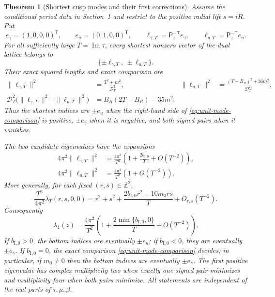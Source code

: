 \documentclass[11pt]{article}
\numberwithin{equation}{section}
\newtheorem{theorem}{Theorem}[section]
\theoremstyle{definition}
\theoremstyle{remark}
\newcommand{\Z}{\mathbb Z}
\begin{document}
\begin{theorem}[Shortest cusp modes and their first corrections]
\label{thm:cusp-gap}
Assume the conditional period data in Section~1 and restrict to the positive
radial lift $s=iR$.  Put
\[
 e_\gamma=(1,0,0,0)^{\mathsf T},\qquad
 e_u=(0,1,0,0)^{\mathsf T},\qquad
 \ell_{\gamma,T}=\mathsf P_z^{-\mathsf T}e_\gamma,\qquad
 \ell_{u,T}=\mathsf P_z^{-\mathsf T}e_u.
\]
For all sufficiently large $T=\operatorname{Im}\tau$, every shortest
nonzero vector of the dual lattice belongs to
\[
 \{\pm\ell_{\gamma,T},\ \pm\ell_{u,T}\}.
\]
Their exact squared lengths and exact comparison are
\begin{align}
 \|\ell_{\gamma,T}\|^2
 &=\frac{T^2+m^2}{\mathcal D_T^2},&
 \|\ell_{u,T}\|^2
 &=\frac{(T-B_R)^2+36m^2}{\mathcal D_T^2},
 \label{eq:unit-mode-exact-lengths}\\
 \mathcal D_T^2
 \bigl(\|\ell_{\gamma,T}\|^2-\|\ell_{u,T}\|^2\bigr)
 &=B_R(2T-B_R)-35m^2.
 \label{eq:unit-mode-comparison}
\end{align}
Thus the shortest indices are $\pm e_u$ when the right-hand side of
\eqref{eq:unit-mode-comparison} is positive, $\pm e_\gamma$ when it is
negative, and both signed pairs when it vanishes.

The two candidate eigenvalues have the expansions
\begin{align}
 4\pi^2\|\ell_{\gamma,T}\|^2
 &=\frac{4\pi^2}{T^2}
   \left(1+\frac{2b_{\mathrm I,0}}{T}+O(T^{-2})\right),
 \label{eq:gamma-eigenvalue-correction}\\
 4\pi^2\|\ell_{u,T}\|^2
 &=\frac{4\pi^2}{T^2}
   \left(1+O(T^{-2})\right).
 \label{eq:u-eigenvalue-correction}
\end{align}
More generally, for each fixed $(r,s)\in\Z^2$,
\begin{equation}\label{eq:general-plane-mode-correction}
 \frac{T^2}{4\pi^2}\lambda_T(r,s,0,0)
 =r^2+s^2+\frac{2b_{\mathrm I,0}r^2-10m_0rs}{T}+O_{r,s}(T^{-2}).
\end{equation}
Consequently
\begin{equation}\label{eq:cusp-gap-result}
 \boxed{\lambda_1(z)=\frac{4\pi^2}{T^2}
 \left(1+\frac{2\min\{b_{\mathrm I,0},0\}}{T}+O(T^{-2})\right).}
\end{equation}
If $b_{\mathrm I,0}>0$, the bottom indices are eventually $\pm e_u$; if
$b_{\mathrm I,0}<0$, they are eventually $\pm e_\gamma$.  If
$b_{\mathrm I,0}=0$, the exact comparison
\eqref{eq:unit-mode-comparison} decides; in particular, if $m_0\ne0$ then
the bottom indices are eventually $\pm e_\gamma$.  The first positive
eigenvalue has complex multiplicity two when exactly one signed pair
minimizes and multiplicity four when both pairs minimize.  All statements
are independent of the real parts of $\tau,\mu,\beta$.
\end{theorem}
\end{document}
